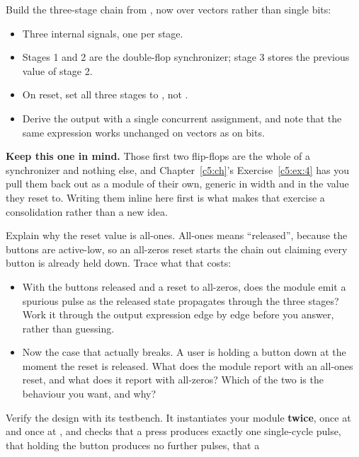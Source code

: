 \begin{parts}
  \item Build the three-stage chain from , now over vectors rather than single bits:
    \begin{itemize}
      \item Three internal  signals, one per stage.
      \item Stages 1 and 2 are the double-flop synchronizer; stage 3 stores the previous value of
        stage 2.
      \item On reset, set all three stages to , not .
      \item Derive the output with a single concurrent assignment, and note that the same
        expression works unchanged on vectors as on bits.
    \end{itemize}
    \textbf{Keep this one in mind.} Those first two flip-flops are the whole of a synchronizer and
    nothing else, and Chapter~\ref{c5:ch}'s Exercise~\ref{c5:ex:4} has you pull them back out as a
    module of their own, generic in width and in the value they reset to. Writing them inline here
    first is what makes that exercise a consolidation rather than a new idea.
  \item Explain why the reset value is all-ones. All-ones means ``released'', because the buttons
    are active-low, so an all-zeros reset starts the chain out claiming every button is already
    held down. Trace what that costs:
    \begin{itemize}
      \item With the buttons released and a reset to all-zeros, does the module emit a spurious
        pulse as the released state propagates through the three stages? Work it through the
        output expression edge by edge before you answer, rather than guessing.
      \item Now the case that actually breaks. A user is holding a button down at the moment the
        reset is released. What does the module report with an all-ones reset, and what does it
        report with all-zeros? Which of the two is the behaviour you want, and why?
    \end{itemize}
  \item Verify the design with its testbench. It instantiates your module \textbf{twice}, once at
    \mbox{} and once at \mbox{}, and checks that a press produces
    exactly one single-cycle pulse, that holding the button produces no further pulses, that a

\end{parts}
